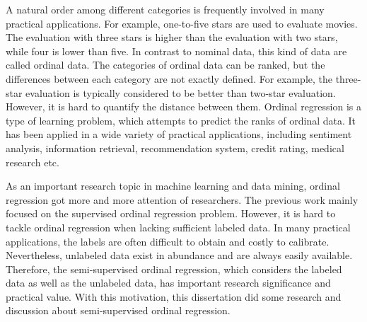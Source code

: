 \begin{enabstract}

A natural order among different categories is frequently involved in many practical applications. For example, one-to-five stars are used to evaluate movies. The evaluation with three stars is higher than the evaluation with two stars, while four is lower than five. In contrast to nominal data, this kind of data are called ordinal data. The categories of ordinal data can be ranked, but the differences between each category are not exactly defined. For example, the three-star evaluation is typically considered to be better than two-star evaluation. However, it is hard to quantify the distance between them. Ordinal regression is a type of learning problem, which attempts to predict the ranks of ordinal data. It has been applied in a wide variety of practical applications, including sentiment analysis, information retrieval, recommendation system, credit rating, medical research etc.

As an important research topic in machine learning and data mining, ordinal regression got more and more attention of researchers. The previous work mainly focused on the supervised ordinal regression problem. However, it is hard to tackle ordinal regression when lacking sufficient labeled data. In many practical applications, the labels are often difficult to obtain and costly to calibrate. Nevertheless, unlabeled data exist in abundance and are always easily available. Therefore, the semi-supervised ordinal regression, which considers the labeled data as well as the unlabeled data, has important research significance and practical value. With this motivation, this dissertation did some research and discussion about semi-supervised ordinal regression.


\end{enabstract}
